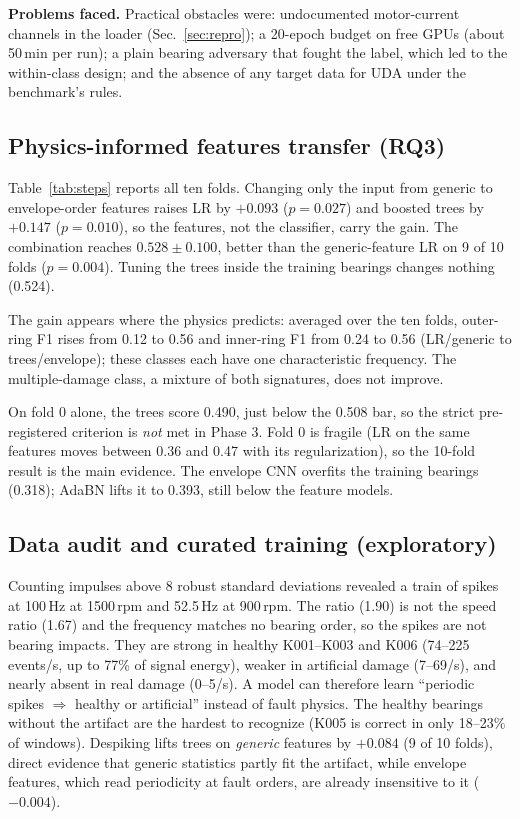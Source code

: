\documentclass[conference]{IEEEtran}
\begin{document}
\textbf{Problems faced.} Practical obstacles were:
undocumented motor-current channels in the loader (Sec.~\ref{sec:repro}); a 20-epoch budget on
free GPUs (about 50\,min per run); a plain bearing adversary that fought the label, which led
to the within-class design; and the absence of any target data for UDA under the benchmark's
rules.

\subsection{Physics-informed features transfer (RQ3)}
Table~\ref{tab:steps} reports all ten folds. Changing only the input from generic to
envelope-order features raises LR by $+0.093$ ($p=0.027$) and boosted trees by $+0.147$
($p=0.010$), so the features, not the classifier, carry the gain. The combination reaches
$0.528\pm0.100$, better than the generic-feature LR on 9 of 10 folds ($p=0.004$). Tuning the
trees inside the training bearings changes nothing (0.524).



The gain appears where the physics predicts: averaged over the ten folds, outer-ring F1 rises from
0.12 to 0.56 and inner-ring F1 from 0.24 to 0.56 (LR/generic to trees/envelope); these classes each have one characteristic
frequency. The multiple-damage class, a mixture of both signatures, does not improve.



On fold 0 alone, the trees score 0.490, just below the 0.508 bar, so the strict pre-registered
criterion is \emph{not} met in Phase 3. Fold 0 is fragile (LR on the same features moves
between 0.36 and 0.47 with its regularization), so the 10-fold result is the main evidence.
The envelope CNN overfits the training bearings (0.318); AdaBN lifts it to 0.393, still below
the feature models.

\subsection{Data audit and curated training (exploratory)}\label{sec:audit}
Counting impulses above 8 robust standard deviations revealed a train of spikes at 100\,Hz at
1500\,rpm and 52.5\,Hz at 900\,rpm. The ratio (1.90) is not the speed ratio (1.67) and the
frequency matches no bearing order, so the spikes are not bearing impacts. They are strong in
healthy K001--K003 and K006 (74--225 events/s, up to 77\% of signal energy), weaker in artificial
damage (7--69/s), and nearly absent in real damage (0--5/s). A model can therefore learn
``periodic spikes $\Rightarrow$ healthy or artificial'' instead of fault physics. The healthy bearings
without the artifact are the hardest to recognize (K005 is correct in only 18--23\% of windows).
Despiking lifts trees on \emph{generic} features by $+0.084$ (9 of 10 folds), direct evidence
that generic statistics partly fit the artifact, while envelope features, which read periodicity
at fault orders, are already insensitive to it ($-0.004$).
\end{document}
